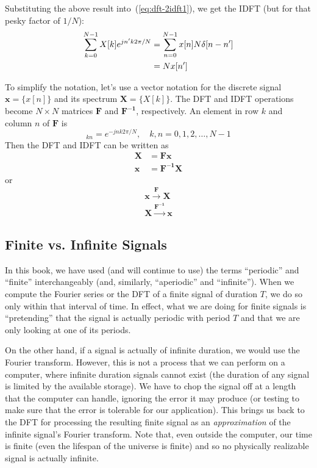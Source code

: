 Substituting the above result into~(\ref{eq:dft-2idft1}), we get the
IDFT (but for that pesky factor of $1/N$):
\begin{align}
\sum_{k=0}^{N-1}X[k] e^{j n' k 2\pi/N}
  &= \sum_{n=0}^{N-1}x[n] N\delta[n-n'] \notag\\
  &= Nx[n']
\end{align}

To simplify the notation, let's use a vector notation for the
discrete signal $\mathbf{x}=\{x[n]\}$ and its spectrum
$\mathbf{X}=\{X[k]\}$.  The DFT and IDFT operations become $N\times N$
matrices $\mathbf{F}$ and $\mathbf{F^{-1}}$, respectively. An element
in row $k$ and column $n$ of $\mathbf{F}$ is
\begin{equation}
[\mathbf{F}]_{kn}= e^{-jnk2\pi/N}, \quad k,n=0,1,2,\ldots,N-1
\end{equation}
Then the DFT and IDFT can be written as
\begin{align}
\mathbf{X} &= \mathbf{F}\mathbf{x}\\
\mathbf{x} &= \mathbf{F^{-1}}\mathbf{X}
\end{align}
or 
\begin{gather}
\mathbf{x}\stackrel{\mathbf{F}}{\longrightarrow} \mathbf{X}\\
\mathbf{X}\stackrel{\mathbf{F^{-1}}}{\longrightarrow} \mathbf{x}
\end{gather}

\subsection{Finite vs. Infinite Signals}

In this book, we have used (and will continue to use) the terms
``periodic'' and ``finite'' interchangeably (and, similarly,
``aperiodic'' and ``infinite''). When we compute the Fourier series or
the DFT of a finite signal of duration $T$, we do so only within that
interval of time. In effect, what we are doing for finite signals is
``pretending'' that the signal is actually periodic with period $T$
and that we are only looking at one of its periods.

On the other hand, if a signal is actually of infinite duration, we
would use the Fourier transform. However, this is not a process that
we can perform on a computer, where infinite duration signals cannot
exist (the duration of any signal is limited by the available
storage). We have to chop the signal off at a length that the computer
can handle, ignoring the error it may produce (or testing to make sure
that the error is tolerable for our application). This brings us back
to the DFT for processing the resulting finite signal as an
\emph{approximation} of the infinite signal's Fourier transform. Note
that, even outside the computer, our time is finite (even the lifespan
of the universe is finite) and so no physically realizable signal is
actually infinite.



